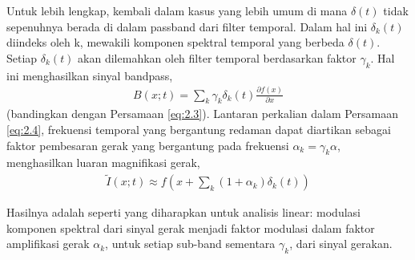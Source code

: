 Untuk lebih lengkap, kembali dalam kasus yang lebih umum di mana \(\delta (t)\) tidak sepenuhnya berada di dalam passband dari filter temporal. Dalam hal ini \({\delta _k}(t)\) diindeks oleh k, mewakili komponen spektral temporal yang berbeda \(\delta (t)\). Setiap \({\delta _k}(t)\) akan dilemahkan oleh filter temporal berdasarkan faktor \({\gamma _k}\). Hal ini menghasilkan sinyal bandpass,
\begin{equation} \label{eq:2.7}
\begin{aligned}
B(x; t) = \sum\limits_k^{} {{\gamma _k}{\delta _k}(t)\frac{{\partial f(x)}}{{\partial x}}}
\end{aligned}
\end{equation}
%
(bandingkan dengan Persamaan \ref{eq:2.3}). Lantaran perkalian dalam Persamaan \ref{eq:2.4}, frekuensi temporal yang bergantung redaman dapat diartikan sebagai faktor pembesaran gerak yang bergantung pada frekuensi \({\alpha _k} = {\gamma _k}\alpha\), menghasilkan luaran magnifikasi gerak,
\begin{equation} \label{eq:2.8}
\begin{aligned}
\tilde I(x;t) \approx f(x + \sum\limits_k {(1 + {\alpha _k})} {\delta _k}(t))
\end{aligned}
\end{equation}

Hasilnya adalah seperti yang diharapkan untuk analisis linear: modulasi komponen spektral dari sinyal gerak menjadi faktor modulasi dalam faktor amplifikasi gerak \(\alpha _k\), untuk setiap sub-band sementara \(\gamma _k\), dari sinyal gerakan.